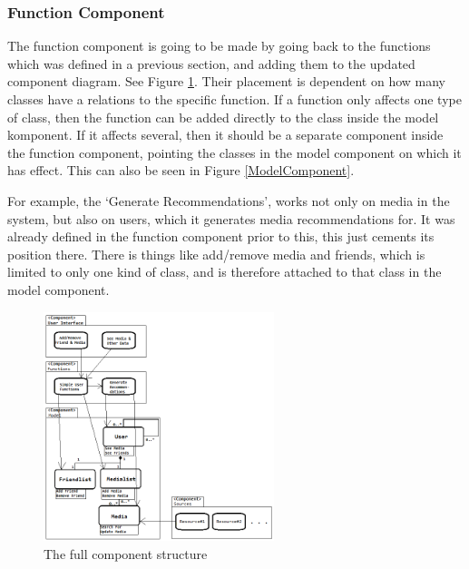 \subsubsection{Function Component}

The function component is going to be made by going back to the functions which was defined in a previous section, and adding them to the updated component diagram. See Figure \ref{FullComponents}. Their placement is dependent on how many classes have a relations to the specific function. If a function only affects one type of class, then the function can be added directly to the class inside the model komponent. If it affects several, then it should be a separate component inside the function component, pointing the classes in the model component on which it has effect. This can also be seen in Figure \ref{ModelComponent}.

For example, the ‘Generate Recommendations’, works not only on media in the system, but also on users, which it generates media recommendations for. It was already defined in the function component prior to this, this just cements its position there. There is things like add/remove media and friends, which is limited to only one kind of class, and is therefore attached to that class in the model component.

\begin{figure}[htb]
\centering
\includegraphics[width=0.6\textwidth]{Images/FullComponents.png}
\caption{The full component structure}
\label{FullComponents}
\end{figure}